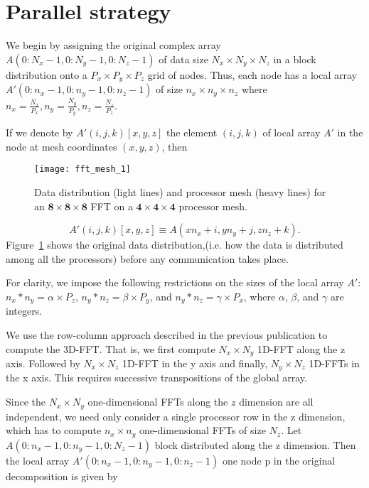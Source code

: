 \section{Parallel strategy} 
We begin by assigning the original complex array
$A(0:N_x-1,0:N_y-1,0:N_z-1)$ of data size $N_x \times N_y \times N_z$
in a block distribution onto a $P_x \times P_y \times P_z$
grid of nodes.  Thus, each node has a local array
$A'(0:n_x-1,0:n_y-1,0:n_z-1)$ of size $n_x \times n_y \times n_z$ where
$n_x = \frac{N_x}{P_x},n_y = \frac{N_y}{P_y}, n_z = \frac{N_z}{P_z}$.
 
If we denote by $A'(i,j,k)[x,y,z]$ the element $(i,j,k)$ of local
array $A'$ in the node at mesh coordinates $(x,y,z)$, then

\begin{figure}
\texttt{[image: fft\_mesh\_1]}
\caption{Data distribution (light lines) and processor mesh (heavy
  lines) for an $\mathbf{8\times 8\times 8}$ FFT on a $\mathbf{4\times 4\times4}$
  processor mesh.}
\label{fig:domain_decomp}
\end{figure}

\begin{equation}
A'(i,j,k)[x,y,z] \equiv A(x n_x+i,y n_y+j,z n_z+k).
\end{equation}
Figure~\ref{fig:domain_decomp} shows the original data
distribution,(i.e. how the data is distributed among all the
processors) before any communication takes place.

For clarity, we impose the following restrictions on the sizes of the
local array $A'$: $n_x * n_y = \alpha \times P_z$, $n_y *n_z = \beta
\times P_y$, and $n_y * n_z = \gamma \times P_x$, where $\alpha$,
$\beta$, and $\gamma$ are integers.

We use the row-column approach described in the previous publication
to compute the 3D-FFT. That is, we first compute $N_x \times N_y $
1D-FFT along the z axis. Followed by $N_x \times N_z$ 1D-FFT in the y
axis and finally, $N_y \times N_z$ 1D-FFTs in the x axis.  This
requires successive transpositions of the global array.

Since the $N_x \times N_y$ one-dimensional FFTs along the $z$
dimension are all independent, we need only consider a single
processor row in the z dimension, which has to compute $n_x \times
n_y$ one-dimensional FFTs of size $N_z$. Let $A(0:n_x-1, 0:n_y-1,
0:N_z-1)$ block distributed along the z dimension. Then the local
array $A'(0:n_x-1, 0:n_y-1, 0:n_z-1)$ one node p in the original
decomposition is given by
 
